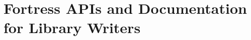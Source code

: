 %
%
%
%

\part{Fortress APIs and Documentation for Library Writers}

\setcounter{tocdepth}{1}







\setcounter{tocdepth}{2}
